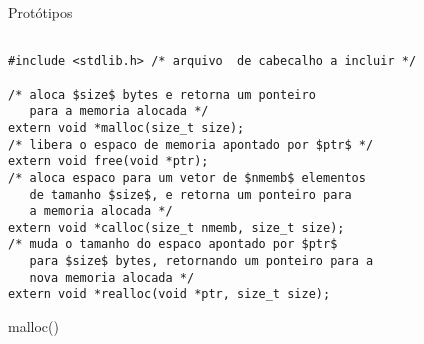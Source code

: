 \begin{frame}[fragile]{Protótipos}

\begin{lstlisting}

#include <stdlib.h> /* arquivo  de cabecalho a incluir */

/* aloca $size$ bytes e retorna um ponteiro 
   para a memoria alocada */
extern void *malloc(size_t size); 
/* libera o espaco de memoria apontado por $ptr$ */
extern void free(void *ptr);
/* aloca espaco para um vetor de $nmemb$ elementos 
   de tamanho $size$, e retorna um ponteiro para
   a memoria alocada */
extern void *calloc(size_t nmemb, size_t size);
/* muda o tamanho do espaco apontado por $ptr$
   para $size$ bytes, retornando um ponteiro para a 
   nova memoria alocada */
extern void *realloc(void *ptr, size_t size);
\end{lstlisting}

\end{frame}

\begin{frame}{malloc()}


\end{frame}


